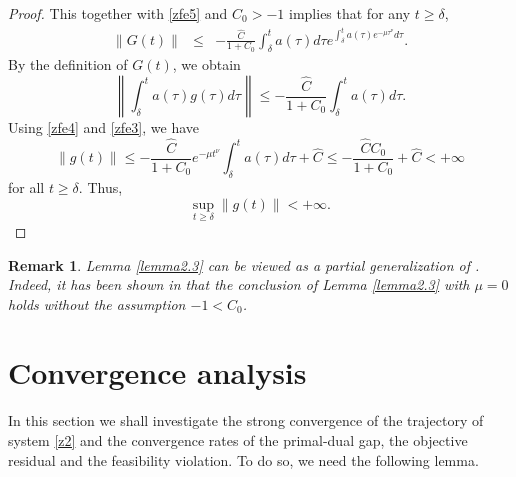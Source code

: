 \documentclass[review]{elsarticle}
\newtheorem{remark}{Remark}[section]
\begin{document}
\begin{proof}
		This  together with \eqref{zfe5} and  $C_0>-1$ implies that for any $t\geq \delta$, 
		\begin{eqnarray*}
			\left\|G(t)\right\|&\leq&-\frac{\widehat{C}}{1+C_0}\int_{\delta}^{t}a(\tau)d\tau e^{\int_{\delta}^{t}a(\tau)e^{-\mu\tau^{\nu}}d\tau}.
		\end{eqnarray*}
		By the definition of $G(t)$, we obtain 
		$$\left\|\int_{\delta}^{t}a(\tau)g(\tau)d\tau\right\|\leq-\frac{\widehat{C}}{1+C_0}\int_{\delta}^{t}a(\tau)d\tau.$$
		Using \eqref{zfe4} and \eqref{zfe3},  we have 
		$$\left\|g(t)\right\|\leq-\frac{\widehat{C}}{1+C_0}e^{-\mu t^{\nu}}\int_{\delta}^{t}a(\tau)d\tau+\widehat{C}\leq -\frac{\widehat{C}C_0}{1+C_0}+\widehat{C}<+\infty$$
for all $t\geq \delta$.
		Thus,
		$$\sup_{t\geq \delta}\|g(t)\|<+\infty.$$
	\end{proof}
	
\begin{remark}  
Lemma  \ref{lemma2.3}  can be viewed as a partial generalization of \cite[Lemma 3.3]{HeTLFconver(2023)}. Indeed, it has been shown in \cite[Lemma 3.3]{HeHFiietal(2022)} that    the conclusion of  Lemma  \ref{lemma2.3} with  $\mu=0$ holds without the assumption  $-1< C_0$.
\end{remark}
	
	
	\section{Convergence analysis}
In this section we shall investigate  the strong convergence of  the trajectory of system \eqref{z2} and   the convergence rates of the primal-dual gap, the objective residual and the feasibility violation. To do so, we need the following lemma.
\end{document}
